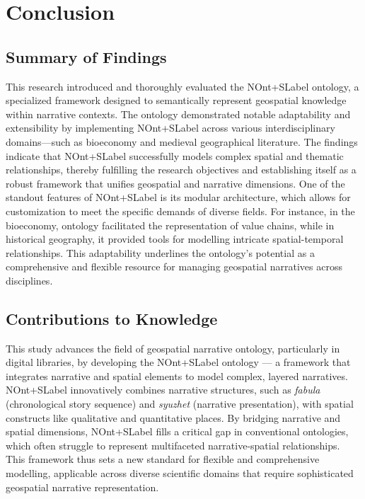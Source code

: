 \chapter{Conclusion}\label{chap:conclusion}

\section{Summary of Findings}

This research introduced and thoroughly evaluated the \acrfull{NOnt+SLabel} ontology, a specialized framework designed to semantically represent geospatial knowledge within narrative contexts. The ontology demonstrated notable adaptability and extensibility by implementing \acrshort{NOnt+SLabel} across various interdisciplinary domains—such as bioeconomy and medieval geographical literature. The findings indicate that \acrshort{NOnt+SLabel} successfully models complex spatial and thematic relationships, thereby fulfilling the research objectives and establishing itself as a robust framework that unifies geospatial and narrative dimensions. One of the standout features of \acrshort{NOnt+SLabel} is its modular architecture, which allows for customization to meet the specific demands of diverse fields. For instance, in the bioeconomy, ontology facilitated the representation of value chains, while in historical geography, it provided tools for modelling intricate spatial-temporal relationships. This adaptability underlines the ontology’s potential as a comprehensive and flexible resource for managing geospatial narratives across disciplines.

\section{Contributions to Knowledge}

This study advances the field of geospatial narrative ontology, particularly in digital libraries, by developing the \acrshort{NOnt+SLabel} ontology — a framework that integrates narrative and spatial elements to model complex, layered narratives. \acrshort{NOnt+SLabel} innovatively combines narrative structures, such as \textit{fabula} (chronological story sequence) and \textit{syuzhet} (narrative presentation), with spatial constructs like qualitative and quantitative places. By bridging narrative and spatial dimensions, \acrshort{NOnt+SLabel} fills a critical gap in conventional ontologies, which often struggle to represent multifaceted narrative-spatial relationships. This framework thus sets a new standard for flexible and comprehensive modelling, applicable across diverse scientific domains that require sophisticated geospatial narrative representation.

